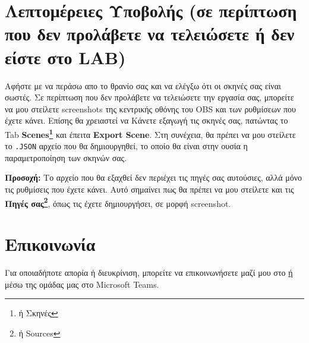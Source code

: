 \documentclass[12pt,a4paper]{article}
\begin{document}
\section*{Λεπτομέρειες Υποβολής (σε περίπτωση που δεν προλάβετε να τελειώσετε ή δεν είστε στο LAB)}
\noindent Αφήστε με να περάσω απο το θρανίο σας και να ελέγξω ότι οι σκηνές σας είναι σωστές.
Σε περίπτωση που δεν προλάβετε να τελειώσετε την εργασία σας, μπορείτε να μου στείλετε
screenshots της κεντρικής οθόνης του OBS και των ρυθμίσεων που έχετε κάνει. Επίσης θα χρειαστεί να
Κάνετε εξαγωγή τις σκηνές σας, πατώντας το Tab \textbf{Scenes\footnote{ή Σκηνές}} και έπειτα
\textbf{Export Scene}. Στη συνέχεια, θα πρέπει να μου στείλετε το \texttt{.JSON} αρχείο που θα δημιουργηθεί,
το οποίο θα είναι στην ουσία η παραμετροποίηση των σκηνών σας.
\begin{info}
  \textbf{Προσοχή:} Το αρχείο που θα εξαχθεί δεν περιέχει τις πηγές σας αυτούσιες, αλλά μόνο τις ρυθμίσεις που έχετε κάνει.
  Αυτό σημαίνει πως θα πρέπει να μου στείλετε και τις \textbf{Πηγές σας\footnote{ή Sources}}, όπως τις έχετε δημιουργήσει, σε μορφή screenshot.
\end{info}
\section*{Επικοινωνία}
Για οποιαδήποτε απορία ή διευκρίνιση, μπορείτε να επικοινωνήσετε μαζί μου στο \href{mailto:dit17046@uop.gr} ή μέσω της
ομάδας μας στο Microsoft Teams.
\end{document}
